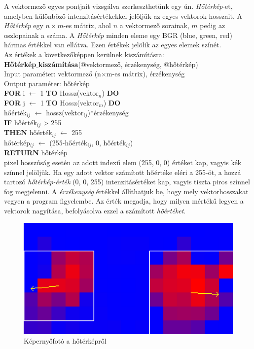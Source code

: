 
A vektormező egyes pontjait vizsgálva szerkeszthetünk egy ún. \textit{Hőtérkép}-et, amelyben különböző intenzitásértékekkel jelöljük az egyes vektorok hosszait. A \textit{Hőtérkép} egy $n \times m$-es mátrix, ahol $n$ a vektormező sorainak, $m$ pedig az oszlopainak a száma. A \textit{Hőtérkép} minden eleme egy BGR (blue, green, red) hármas értékkel van ellátva. Ezen értékek jelölik az egyes elemek színét.\\
Az értékek a következőképpen kerülnek kiszámításra:\\
\newline
\noindent \textbf{Hőtérkép$\_$kiszámítása}(@vektormező, érzékenység, @hőtérkép)\\ 
Input paraméter: vektormező (n$\times$m-es mátrix), érzékenység\\
Output paraméter: hőtérkép\\
\textbf{FOR} i $\leftarrow$ 1 \textbf{TO} Hossz(vektor$_n$) \textbf{DO}\\
\indent \textbf{FOR} j $\leftarrow$ 1 \textbf{TO} Hossz(vektor$_m$) \textbf{DO}\\
\indent \indent hőérték$_{ij}$ $\leftarrow$ hossz(vektor$_{ij}$)*érzékenység\\
\indent \indent \textbf{IF} hőérték$_{ij}$ > 255\\
\indent \indent \indent \textbf{THEN} hőérték$_{ij}$ $\leftarrow$ 255\\
\indent \indent hőtérkép$_{ij}$ $\leftarrow$ (255-hőérték$_{ij}$, 0, hőérték$_{ij}$)\\
\textbf{RETURN} hőtérkép\\
 pixel hosszúság esetén az adott indexű elem (255, 0, 0) értéket kap, vagyis kék színnel jelöljük. Ha egy adott vektor számított hőértéke eléri a 255-öt, a hozzá tartozó \textit{hőtérkép-érték} (0, 0, 255) intenzitásértéket kap, vagyis tiszta piros színnel fog megjelenni.
A \textit{érzékenység} értékkel állíthatjuk be, hogy mely vektorhosszakat vegyen a program figyelembe. Az érték megadja, hogy milyen mértékű legyen a vektorok nagyítása, befolyásolva ezzel a számított \textit{hőértéket}.

\begin{figure}[h]
\centering
\includegraphics[width=11.2truecm, height=6.3truecm]{images/HeatMap_screenshot.png}
\caption{Képernyőfotó a hőtérképről}
\label{fig:heatmap}
\end{figure}

